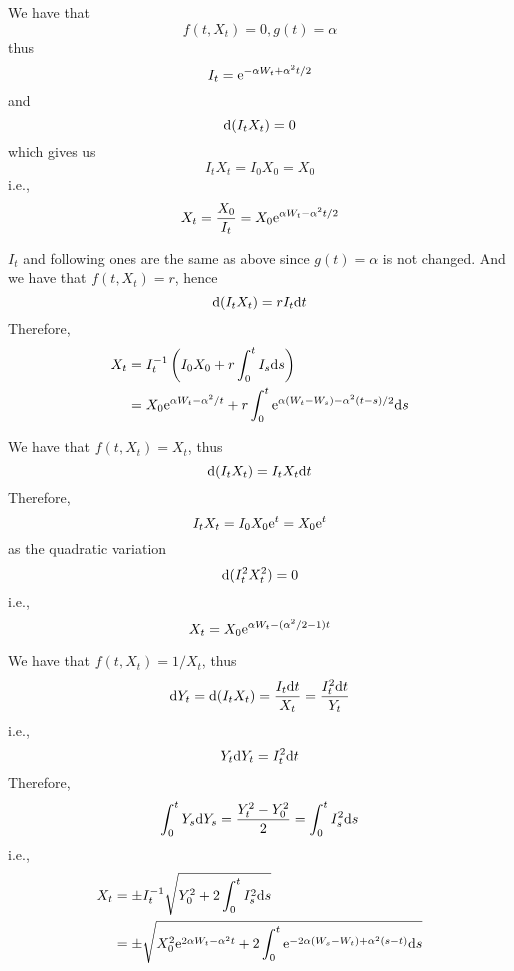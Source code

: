 \documentclass{homework}
\begin{document}
    \problem
    \begin{subproblem}[(\alph*)]
        \item
        We have that
        \[f(t,X_t)=0,g(t)=\alpha\]
        thus
        \[I_t=\mathrm e^{-\alpha W_t+\alpha^2t/2}\]
        and
        \[\mathrm d(I_tX_t)=0\]
        which gives us
        \[I_tX_t=I_0X_0=X_0\]
        i.e.,
        \[X_t=\frac{X_0}{I_t}=X_0\mathrm e^{\alpha W_t-\alpha^2t/2}\]

        \item
        $I_t$ and following ones are the same as above
        since $g(t)=\alpha$ is not changed.
        And we have that $f(t,X_t)=r$, hence
        \[\mathrm d(I_tX_t)=rI_t\mathrm d t\]
        Therefore,
        \[\begin{aligned}
            X_t&=I_t^{-1}\left(I_0X_0+r\int_0^tI_s\mathrm d s\right)\\
            &=X_0\mathrm e^{\alpha W_t-\alpha^2/t}+r\int_0^t\mathrm e^{\alpha(W_t-W_s)-\alpha^2(t-s)/2}\mathrm d s
        \end{aligned}\]

        \item
        We have that $f(t,X_t)=X_t$, thus
        \[\mathrm d(I_tX_t)=I_tX_t\mathrm d t\]
        Therefore,
        \[I_tX_t=I_0X_0\mathrm e^t=X_0\mathrm e^t\]
        as the quadratic variation
        \[\mathrm d(I_t^2X_t^2)=0\]
        i.e.,
        \[X_t=X_0\mathrm e^{\alpha W_t-(\alpha^2/2-1)t}\]

        \item
        We have that $f(t,X_t)=1/X_t$, thus
        \[\mathrm d Y_t=\mathrm d(I_tX_t)=\frac{I_t\mathrm d t}{X_t}
        =\frac{I_t^2\mathrm d t}{Y_t}\]
        i.e.,
        \[Y_t\mathrm d Y_t=I_t^2\mathrm d t\]
        Therefore,
        \[\int_0^tY_s\mathrm d Y_s=\frac{Y_t^2-Y_0^2}{2}=\int_0^tI_s^2\mathrm d s\]
        i.e.,
        \[\begin{aligned}
            X_t&=\pm I_t^{-1}\sqrt{Y_0^2+2\int_0^tI_s^2\mathrm d s}\\
            &=\pm\sqrt{X_0^2\mathrm e^{2\alpha W_t-\alpha^2t}
            +2\int_0^t\mathrm e^{-2\alpha(W_s-W_t)+\alpha^2(s-t)}\mathrm d s}
        \end{aligned}\]

    \end{subproblem}
\end{document}
